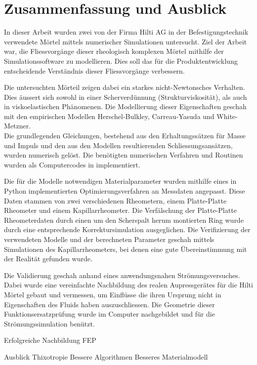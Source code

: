\section{Zusammenfassung und Ausblick}
\label{Kapitel:Outlook}
In dieser Arbeit wurden zwei von der Firma Hilti AG in der Befestigungstechnik verwendete Mörtel mittels numerischer Simulationen untersucht.
Ziel der Arbeit war, die Fliessvorgänge dieser rheologisch komplexen Mörtel mithilfe der Simulationssoftware \openfoam{} zu modellieren. Dies soll das für die Produktentwicklung entscheidende Verständnis dieser Fliessvorgänge verbessern.

Die untersuchten Mörteil zeigen dabei ein starkes nicht-Newtonsches Verhalten.
Dies äussert sich sowohl in einer Scherverdünnung (Strukturviskosität), als auch in viskoelastischen Phänomenen. Die Modellierung dieser Eigenschaften geschah mit den empirischen Modellen Herschel-Bulkley, Carreau-Yasuda und White-Metzner.\\
Die grundlegenden Gleichungen, bestehend aus den Erhaltungssätzen für Masse und Impuls und den aus den Modellen resultierenden Schliessungsansätzen, wurden numerisch gelöst. Die benötigten numerischen Verfahren und Routinen wurden als Computercodes in \openfoam{} implementiert.

Die für die Modelle notwendigen Materialparameter wurden mithilfe eines in Python implementierten Optimierungsverfahren an Messdaten angepasst. Diese Daten stammen von zwei verschiedenen Rheometern, einem Platte-Platte Rheometer und einem Kapillarrheometer.
Die Verfälschung der Platte-Platte Rheometerdaten durch einen um den Scherspalt herum montierten Ring wurde durch eine entsprechende Korrektursimulation ausgeglichen.
Die Verifizierung der verwendeten Modelle und der berechneten Parameter geschah mittels Simulationen des Kapillarrheometers, bei denen eine gute Übereinstimmung mit der Realität gefunden wurde.

Die Validierung geschah anhand eines anwendungsnahen Strömungsversuches. Dabei wurde eine vereinfachte Nachbildung des realen Aupressgerätes für die Hilti Mörtel gebaut und vermessen, um Einflüsse die ihren Ursprung nicht in Eigenschaften des Fluids haben auszuschliessen.
Die Geometrie dieser Funktionsersatzprüfung wurde im Computer nachgebildet und für die Strömungssimulation benützt.
\begin{todocontent}
        \1 Erfolgreiche Nachbildung FEP%
\end{todocontent}
%
\begin{todocontent}
    \1 Ausblick
        \2 Thixotropie
        \2 Bessere Algorithmen
        \2 Besseres Materialmodell
\end{todocontent}
